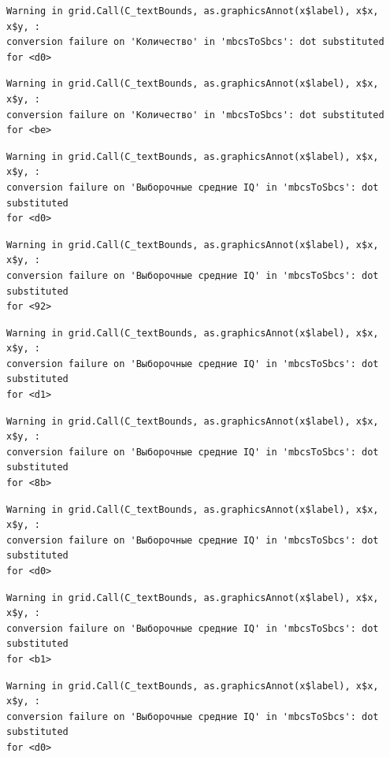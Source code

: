 \documentclass[
  letterpaper,
]{scrbook}
\theoremstyle{definition}
\theoremstyle{remark}
\begin{document}
\begin{verbatim}
Warning in grid.Call(C_textBounds, as.graphicsAnnot(x$label), x$x, x$y, :
conversion failure on 'Количество' in 'mbcsToSbcs': dot substituted for <d0>
\end{verbatim}

\begin{verbatim}
Warning in grid.Call(C_textBounds, as.graphicsAnnot(x$label), x$x, x$y, :
conversion failure on 'Количество' in 'mbcsToSbcs': dot substituted for <be>
\end{verbatim}

\begin{verbatim}
Warning in grid.Call(C_textBounds, as.graphicsAnnot(x$label), x$x, x$y, :
conversion failure on 'Выборочные средние IQ' in 'mbcsToSbcs': dot substituted
for <d0>
\end{verbatim}

\begin{verbatim}
Warning in grid.Call(C_textBounds, as.graphicsAnnot(x$label), x$x, x$y, :
conversion failure on 'Выборочные средние IQ' in 'mbcsToSbcs': dot substituted
for <92>
\end{verbatim}

\begin{verbatim}
Warning in grid.Call(C_textBounds, as.graphicsAnnot(x$label), x$x, x$y, :
conversion failure on 'Выборочные средние IQ' in 'mbcsToSbcs': dot substituted
for <d1>
\end{verbatim}

\begin{verbatim}
Warning in grid.Call(C_textBounds, as.graphicsAnnot(x$label), x$x, x$y, :
conversion failure on 'Выборочные средние IQ' in 'mbcsToSbcs': dot substituted
for <8b>
\end{verbatim}

\begin{verbatim}
Warning in grid.Call(C_textBounds, as.graphicsAnnot(x$label), x$x, x$y, :
conversion failure on 'Выборочные средние IQ' in 'mbcsToSbcs': dot substituted
for <d0>
\end{verbatim}

\begin{verbatim}
Warning in grid.Call(C_textBounds, as.graphicsAnnot(x$label), x$x, x$y, :
conversion failure on 'Выборочные средние IQ' in 'mbcsToSbcs': dot substituted
for <b1>
\end{verbatim}

\begin{verbatim}
Warning in grid.Call(C_textBounds, as.graphicsAnnot(x$label), x$x, x$y, :
conversion failure on 'Выборочные средние IQ' in 'mbcsToSbcs': dot substituted
for <d0>
\end{verbatim}
\end{document}
